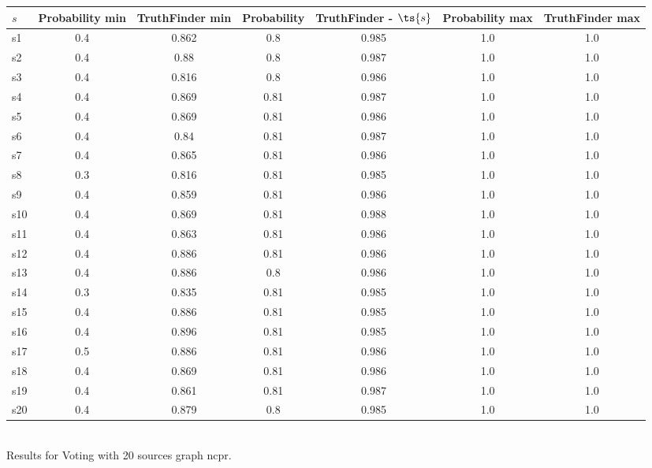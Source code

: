\documentclass{article}
\begin{document}
\noindent\begin{tabular}{|l|c|c|c|c|c|c|}
\hline
$s$& Probability min & TruthFinder min & Probability & TruthFinder - $\ts{s}$ & Probability max & TruthFinder max\\
\hline
s1 &0.4 & 0.862 & 0.8 & 0.985 & 1.0 & 1.0\\
\hline
s2 &0.4 & 0.88 & 0.8 & 0.987 & 1.0 & 1.0\\
\hline
s3 &0.4 & 0.816 & 0.8 & 0.986 & 1.0 & 1.0\\
\hline
s4 &0.4 & 0.869 & 0.81 & 0.987 & 1.0 & 1.0\\
\hline
s5 &0.4 & 0.869 & 0.81 & 0.986 & 1.0 & 1.0\\
\hline
s6 &0.4 & 0.84 & 0.81 & 0.987 & 1.0 & 1.0\\
\hline
s7 &0.4 & 0.865 & 0.81 & 0.986 & 1.0 & 1.0\\
\hline
s8 &0.3 & 0.816 & 0.81 & 0.985 & 1.0 & 1.0\\
\hline
s9 &0.4 & 0.859 & 0.81 & 0.986 & 1.0 & 1.0\\
\hline
s10 &0.4 & 0.869 & 0.81 & 0.988 & 1.0 & 1.0\\
\hline
s11 &0.4 & 0.863 & 0.81 & 0.986 & 1.0 & 1.0\\
\hline
s12 &0.4 & 0.886 & 0.81 & 0.986 & 1.0 & 1.0\\
\hline
s13 &0.4 & 0.886 & 0.8 & 0.986 & 1.0 & 1.0\\
\hline
s14 &0.3 & 0.835 & 0.81 & 0.985 & 1.0 & 1.0\\
\hline
s15 &0.4 & 0.886 & 0.81 & 0.985 & 1.0 & 1.0\\
\hline
s16 &0.4 & 0.896 & 0.81 & 0.985 & 1.0 & 1.0\\
\hline
s17 &0.5 & 0.886 & 0.81 & 0.986 & 1.0 & 1.0\\
\hline
s18 &0.4 & 0.869 & 0.81 & 0.986 & 1.0 & 1.0\\
\hline
s19 &0.4 & 0.861 & 0.81 & 0.987 & 1.0 & 1.0\\
\hline
s20 &0.4 & 0.879 & 0.8 & 0.985 & 1.0 & 1.0\\
\hline
\end{tabular}\\

\noindent Results for Voting with 20 sources graph ncpr.
\end{document}
